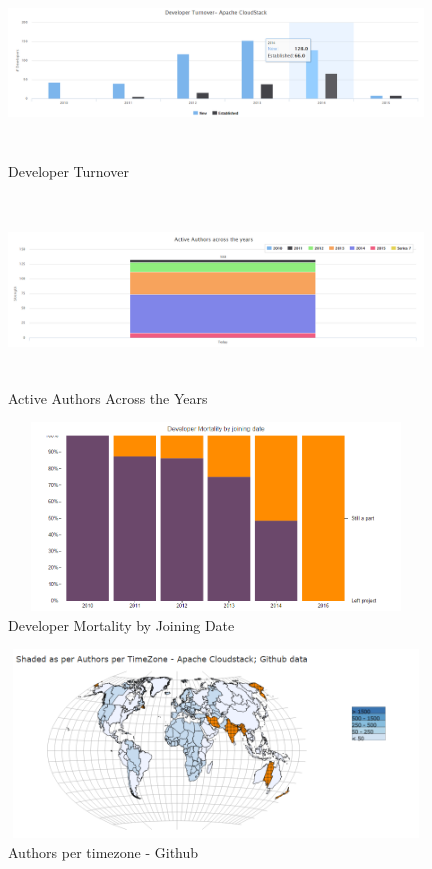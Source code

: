 \documentclass[double,12pt]{beavtex}
\begin{document}
\begin{figure}[!ht]
\centering
\includegraphics[width=110mm,height=50mm]{image1.PNG}
\caption{Developer Turnover}
\end{figure}

\begin{figure}[!ht]
\centering
\includegraphics[width=110mm,height=50mm]{image2.PNG}
\caption{Active Authors Across the Years}
\end{figure}

\begin{figure}[!ht]
\centering
\includegraphics[width=110mm,height=50mm]{image3.PNG}
\caption{Developer Mortality by Joining Date}
\end{figure}

\begin{figure}[!ht]
\centering
\includegraphics[width=110mm,height=50mm]{image4.PNG}
\caption{Authors per timezone - Github}
\end{figure}
\end{document}
